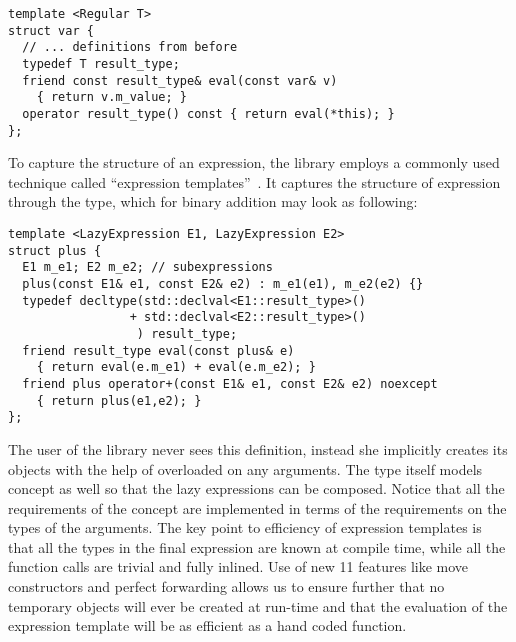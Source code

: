 \begin{lstlisting}
template <Regular T>
struct var {
  // ... definitions from before
  typedef T result_type;
  friend const result_type& eval(const var& v) 
    { return v.m_value; }
  operator result_type() const { return eval(*this); }
};
\end{lstlisting}

\noindent
To capture the structure of an expression, the library employs a commonly used 
technique called ``expression templates''~\cite{Veldhuizen95expressiontemplates, 
vandevoorde2003c++}. It captures the structure of expression through the type, 
which for binary addition may look as following:

\begin{lstlisting}[keepspaces,columns=flexible]
template <LazyExpression E1, LazyExpression E2>
struct plus {
  E1 m_e1; E2 m_e2; // subexpressions
  plus(const E1& e1, const E2& e2) : m_e1(e1), m_e2(e2) {}
  typedef decltype(std::declval<E1::result_type>() 
                 + std::declval<E2::result_type>()
                  ) result_type;
  friend result_type eval(const plus& e) 
    { return eval(e.m_e1) + eval(e.m_e2); }
  friend plus operator+(const E1& e1, const E2& e2) noexcept 
    { return plus(e1,e2); }
};
\end{lstlisting}

\noindent
The user of the library never sees this definition, instead she implicitly 
creates its objects with the help of overloaded  on any 
 arguments. The type itself models  
concept as well so that the lazy expressions can be composed. Notice that all 
the requirements of the concept are implemented in terms of the requirements 
on the types of the arguments. The key point to efficiency of expression 
templates is that all the types in the final expression are known at compile 
time, while all the function calls are trivial and fully inlined. Use of new 
\Cpp{}11 features like move constructors and perfect forwarding allows us to 
ensure further that no temporary objects will ever be created at run-time and 
that the evaluation of the expression template will be as efficient as a hand 
coded function.

